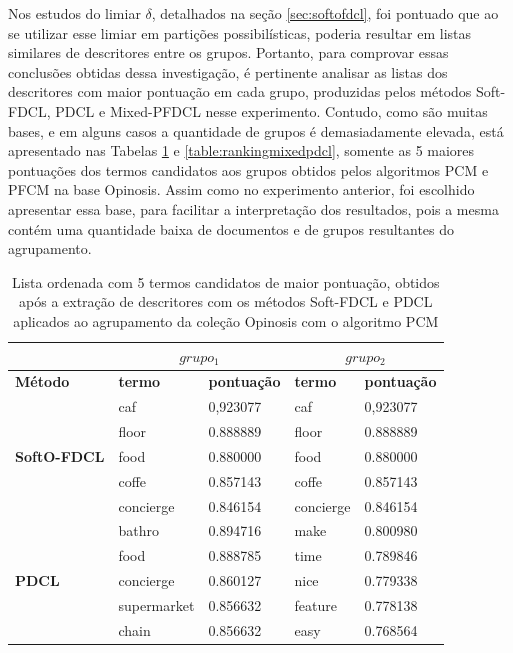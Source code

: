 Nos estudos do limiar $\delta$, detalhados na seção \ref{sec:softofdcl}, foi pontuado que ao 
se utilizar esse limiar em partições possibilísticas, poderia resultar em listas similares de
descritores entre os grupos. Portanto, para comprovar essas conclusões obtidas dessa
investigação, é pertinente analisar as listas dos descritores com maior pontuação em cada grupo,
produzidas pelos métodos Soft-FDCL, PDCL e Mixed-PFDCL nesse experimento. Contudo, como são muitas
bases, e em alguns casos a quantidade de grupos é demasiadamente elevada, está apresentado nas
Tabelas \ref{table:rankingpdcl} e \ref{table:rankingmixedpdcl}, somente as 5 maiores pontuações dos
termos candidatos aos grupos obtidos pelos algoritmos PCM e PFCM na base Opinosis. Assim como no
experimento anterior, foi escolhido apresentar essa base, para facilitar a interpretação dos
resultados, pois a mesma contém uma quantidade baixa de documentos e de grupos resultantes do
agrupamento.

\begin{table}[!htp]
  \centering
  \begin{tabular}{ |l| l l | l l|}
    \hline
    & \multicolumn{2}{c|}{$grupo_1$} & \multicolumn{2}{c|}{$grupo_2$} \\
    \hline
    {\bf Método} & {\bf termo} & {\bf pontuação} & {\bf termo} & {\bf pontuação} \\
    \hline
    \multirow{5}{*}{{\bf SoftO-FDCL}} & caf & 0,923077 & caf & 0,923077 \\
                                       & floor	    & 0.888889  & floor	  & 0.888889 \\
                                       & food	    & 0.880000  & food	  & 0.880000 \\
                                       & coffe	    & 0.857143  & coffe	  & 0.857143 \\
                                       & concierge  & 0.846154  & concierge & 0.846154 \\
    \hline
    \multirow{5}{*}{{\bf PDCL}} & bathro      &  0.894716  & make    & 0.800980 \\       
                                 & food        &  0.888785  & time    & 0.789846 \\       
                                 & concierge    &  0.860127  & nice    & 0.779338 \\       
                                 & supermarket &  0.856632  & feature & 0.778138 \\       
                                 & chain       &  0.856632  & easy    & 0.768564 \\       
    \hline
  \end{tabular}
  \caption{Lista ordenada com 5 termos candidatos de maior pontuação, obtidos após a extração de
  descritores com os métodos Soft-FDCL e PDCL aplicados ao agrupamento da coleção Opinosis com o
algoritmo PCM}
  \label{table:rankingpdcl}
\end{table}

